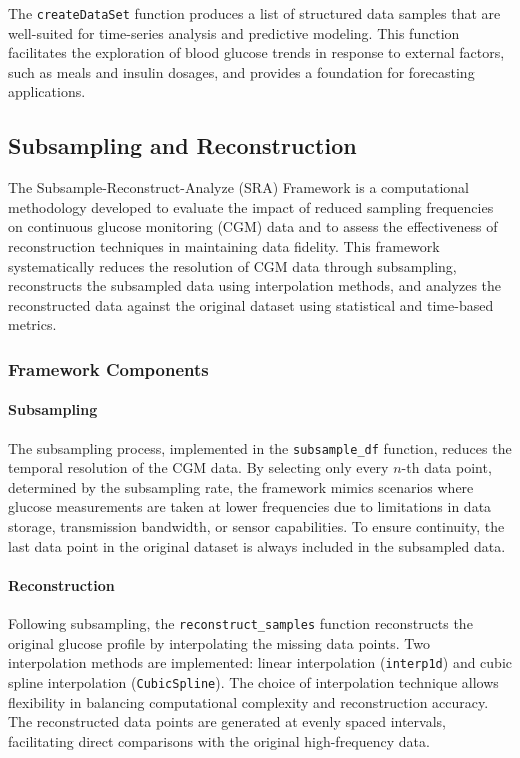 The \texttt{createDataSet} function produces a list of structured data samples that are well-suited for time-series analysis and predictive modeling. This function facilitates the exploration of blood glucose trends in response to external factors, such as meals and insulin dosages, and provides a foundation for forecasting applications.

\subsection{Subsampling and Reconstruction}
The Subsample-Reconstruct-Analyze (SRA) Framework is a computational methodology developed to evaluate the impact of reduced sampling frequencies on continuous glucose monitoring (CGM) data and to assess the effectiveness of reconstruction techniques in maintaining data fidelity. This framework systematically reduces the resolution of CGM data through subsampling, reconstructs the subsampled data using interpolation methods, and analyzes the reconstructed data against the original dataset using statistical and time-based metrics.

\subsubsection{Framework Components}
\paragraph{Subsampling} The subsampling process, implemented in the \texttt{subsample\_df} function, reduces the temporal resolution of the CGM data. By selecting only every \(n\)-th data point, determined by the subsampling rate, the framework mimics scenarios where glucose measurements are taken at lower frequencies due to limitations in data storage, transmission bandwidth, or sensor capabilities. To ensure continuity, the last data point in the original dataset is always included in the subsampled data.

\paragraph{Reconstruction}
Following subsampling, the \texttt{reconstruct\_samples} function reconstructs the original glucose profile by interpolating the missing data points. Two interpolation methods are implemented: linear interpolation (\texttt{interp1d}) and cubic spline interpolation (\texttt{CubicSpline}). The choice of interpolation technique allows flexibility in balancing computational complexity and reconstruction accuracy. The reconstructed data points are generated at evenly spaced intervals, facilitating direct comparisons with the original high-frequency data.

